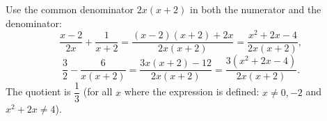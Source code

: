 Use the common denominator $2x(x+2)$ in both the numerator and the denominator:
\[\dfrac{x-2}{2x}+\dfrac{1}{x+2}=\dfrac{(x-2)(x+2)+2x}{2x(x+2)}=\dfrac{x^2+2x-4}{2x(x+2)},\]
\[\dfrac{3}{2}-\dfrac{6}{x(x+2)}=\dfrac{3x(x+2)-12}{2x(x+2)}=\dfrac{3\left(x^2+2x-4\right)}{2x(x+2)}.\]
The quotient is $\boxed{\dfrac{1}{3}}$ (for all $x$ where the expression is defined: $x\ne0,-2$ and $x^2+2x\ne4$).

